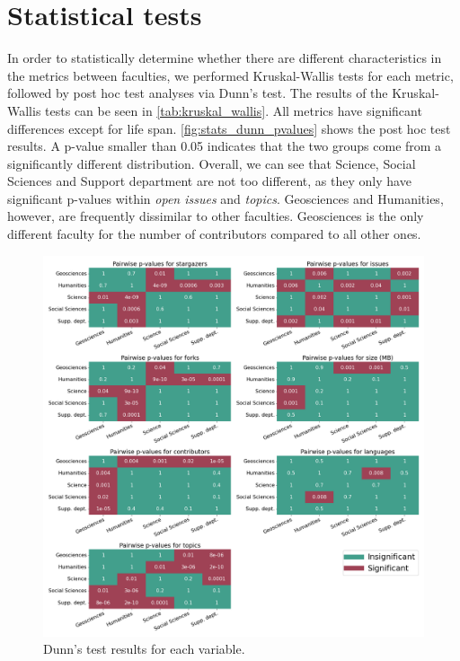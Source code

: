 \vspace{-0.2cm}
\section{Statistical tests}
\label{sec:stattests}
In order to statistically determine whether there are different characteristics in the metrics between faculties, we performed Kruskal-Wallis tests for each metric, followed by post hoc test analyses via Dunn's test. The results of the Kruskal-Wallis tests can be seen in \autoref{tab:kruskal_wallis}. All metrics have significant differences except for life span. \autoref{fig:stats_dunn_pvalues} shows the post hoc test results. A p-value smaller than 0.05 indicates that the two groups come from a significantly different distribution. Overall, we can see that Science, Social Sciences and Support department are not too different, as they only have significant p-values within \textit{open issues} and \textit{topics}. Geosciences and Humanities, however, are frequently dissimilar to other faculties. Geosciences is the only different faculty for the number of contributors compared to all other ones.




\begin{figure}[h!]
\centerline{
\includegraphics[scale=0.47]{figures_results/stats_dunn_pvalues.png}}
\caption{Dunn's test results for each variable.
\label{fig:stats_dunn_pvalues}}
\end{figure}


